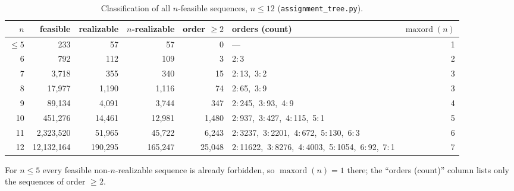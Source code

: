 \documentclass[11pt]{article}
\theoremstyle{definition}
\theoremstyle{remark}
\newcommand{\maxord}{\operatorname{maxord}}
\begin{document}
\begin{table}[ht]
\centering
\caption{Classification of all $n$-feasible sequences, $n\le12$
(\texttt{assignment\_tree.py}).}
\label{tab:census}
\footnotesize
\begin{tabular}{@{}rrrrrlr@{}}
\toprule
$n$ & feasible & realizable & $n$-realizable & order $\ge2$ & orders (count) & $\maxord(n)$ \\
\midrule
$\le5$ & 233 & 57 & 57 & 0 & --- & 1 \\
6 & 792 & 112 & 109 & 3 & 2:\,3 & 2 \\
7 & 3{,}718 & 355 & 340 & 15 & 2:\,13,\ 3:\,2 & 3 \\
8 & 17{,}977 & 1{,}190 & 1{,}116 & 74 & 2:\,65,\ 3:\,9 & 3 \\
9 & 89{,}134 & 4{,}091 & 3{,}744 & 347 & 2:\,245,\ 3:\,93,\ 4:\,9 & 4 \\
10 & 451{,}276 & 14{,}461 & 12{,}981 & 1{,}480 & 2:\,937,\ 3:\,427,\ 4:\,115,\ 5:\,1 & 5 \\
11 & 2{,}323{,}520 & 51{,}965 & 45{,}722 & 6{,}243 & 2:\,3237,\ 3:\,2201,\ 4:\,672,\ 5:\,130,\ 6:\,3 & 6 \\
12 & 12{,}132{,}164 & 190{,}295 & 165{,}247 & 25{,}048 & 2:\,11622,\ 3:\,8276,\ 4:\,4003,\ 5:\,1054,\ 6:\,92,\ 7:\,1 & 7 \\
\bottomrule
\end{tabular}
\end{table}

For $n\le5$ every feasible non-$n$-realizable sequence is already forbidden, so
$\maxord(n)=1$ there; the ``orders (count)'' column lists only the sequences of
order $\ge2$.
\end{document}
